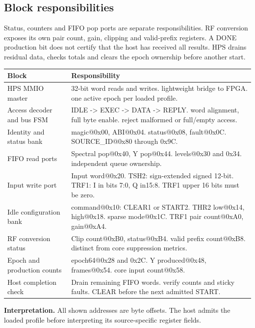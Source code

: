 \documentclass[11pt,letterpaper]{article}
\begin{document}
\subsection*{Block responsibilities}
Status, counters and FIFO pop ports are separate responsibilities. RF conversion exposes its own pair count, gain, clipping and valid-prefix registers. A DONE production bit does not certify that the host has received all results. HPS drains residual data, checks totals and clears the epoch ownership before another start.
\par\medskip\noindent
\begin{tabularx}{\linewidth}{@{}>{\raggedright\arraybackslash}p{1.65in}Y@{}}\toprule
\textbf{Block} & \textbf{Responsibility} \\ \midrule
HPS MMIO master & 32-bit word reads and writes. lightweight bridge to FPGA. one active epoch per loaded profile. \\[5pt]
Access decoder and bus FSM & IDLE -> EXEC -> DATA -> REPLY. word alignment, full byte enable. reject malformed or full/empty access. \\[5pt]
Identity and status bank & magic@0x00, ABI@0x04. status@0x08, fault@0x0C. SOURCE\_ID@0x80 through 0x9C. \\[5pt]
FIFO read ports & Spectral pop@0x40, Y pop@0x44. levels@0x30 and 0x34. independent queue ownership. \\[5pt]
Input write port & Input word@0x20. TSH2: sign-extended signed 12-bit. TRF1: I in bits 7:0, Q in15:8. TRF1 upper 16 bits must be zero. \\[5pt]
Idle configuration bank & command@0x10: CLEAR1 or START2. THR2 low@0x14, high@0x18. sparse mode@0x1C. TRF1 pair count@0xA0, gain@0xA4. \\[5pt]
RF conversion status & Clip count@0xB0, status@0xB4. valid prefix count@0xB8. distinct from core suppression metrics. \\[5pt]
Epoch and production counts & epoch64@0x28 and 0x2C. Y produced@0x48, frames@0x54. core input count@0x58. \\[5pt]
Host completion check & Drain remaining FIFO words. verify counts and sticky faults. CLEAR before the next admitted START. \\[5pt]
\bottomrule\end{tabularx}
\vspace{8pt}
\noindent\textbf{Interpretation.} All shown addresses are byte offsets. The host admits the loaded profile before interpreting its source-specific register fields.
\clearpage
\end{document}
